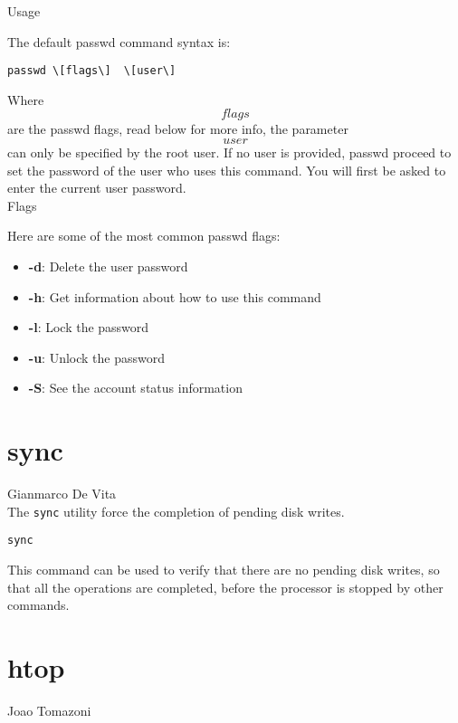 \documentclass[hidelinks,12pt,a4paper,numbers=enddot]{scrartcl}
\begin{document}
Usage

The default passwd command syntax is:

\begin{verbatim}
passwd \[flags\]  \[user\]
\end{verbatim}

Where \[flags\] are the passwd flags, read below for more info, the parameter \[user\] can only be
specified by the root user. If no user is provided, passwd proceed to set the password of the
user who uses this command. You will first be asked to enter the current user password.\\

Flags

Here are some of the most common passwd flags:

\begin{itemize}
   \item  \textbf{-d}: Delete the user password 
   \item  \textbf{-h}: Get information about how to use this command 
   \item  \textbf{-l}: Lock the password 
   \item  \textbf{-u}: Unlock the password 
   \item  \textbf{-S}: See the account status information 
\end{itemize}

\section{sync}


\large Gianmarco De Vita \normalsize\\




The \texttt{sync} utility force the completion of pending disk writes.

\begin{verbatim}
sync
\end{verbatim}



This command can be used to verify that there are no pending disk writes,
so that all the operations are completed, before the processor is stopped by other
commands.


\section{htop}


\large Joao Tomazoni \normalsize\\
\end{document}
